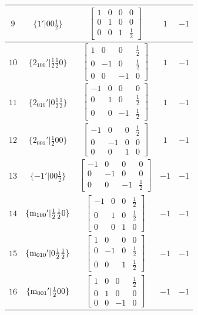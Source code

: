 \documentclass[fleqn,8pt]{jsarticle}
\begin{document}
\begin{longtable}{ccccc}
$ 9 $ & $ \{1{}'|0 0 \frac{1}{2}\} $ & $ \begin{bmatrix} 1 & 0 & 0 & 0 \\ 0 & 1 & 0 & 0 \\ 0 & 0 & 1 & \frac{1}{2} \end{bmatrix} $ & $ 1 $ & $ -1 $ \\ \hline
$ 10 $ & $ \{2{}_{100}{}'|\frac{1}{2} \frac{1}{2} 0\} $ & $ \begin{bmatrix} 1 & 0 & 0 & \frac{1}{2} \\ 0 & -1 & 0 & \frac{1}{2} \\ 0 & 0 & -1 & 0 \end{bmatrix} $ & $ 1 $ & $ -1 $ \\ \hline
$ 11 $ & $ \{2{}_{010}{}'|0 \frac{1}{2} \frac{1}{2}\} $ & $ \begin{bmatrix} -1 & 0 & 0 & 0 \\ 0 & 1 & 0 & \frac{1}{2} \\ 0 & 0 & -1 & \frac{1}{2} \end{bmatrix} $ & $ 1 $ & $ -1 $ \\ \hline
$ 12 $ & $ \{2{}_{001}{}'|\frac{1}{2} 0 0\} $ & $ \begin{bmatrix} -1 & 0 & 0 & \frac{1}{2} \\ 0 & -1 & 0 & 0 \\ 0 & 0 & 1 & 0 \end{bmatrix} $ & $ 1 $ & $ -1 $ \\ \hline
$ 13 $ & $ \{-1{}'|0 0 \frac{1}{2}\} $ & $ \begin{bmatrix} -1 & 0 & 0 & 0 \\ 0 & -1 & 0 & 0 \\ 0 & 0 & -1 & \frac{1}{2} \end{bmatrix} $ & $ -1 $ & $ -1 $ \\ \hline
$ 14 $ & $ \{{\rm m}_{100}{}'|\frac{1}{2} \frac{1}{2} 0\} $ & $ \begin{bmatrix} -1 & 0 & 0 & \frac{1}{2} \\ 0 & 1 & 0 & \frac{1}{2} \\ 0 & 0 & 1 & 0 \end{bmatrix} $ & $ -1 $ & $ -1 $ \\ \hline
$ 15 $ & $ \{{\rm m}_{010}{}'|0 \frac{1}{2} \frac{1}{2}\} $ & $ \begin{bmatrix} 1 & 0 & 0 & 0 \\ 0 & -1 & 0 & \frac{1}{2} \\ 0 & 0 & 1 & \frac{1}{2} \end{bmatrix} $ & $ -1 $ & $ -1 $ \\ \hline
$ 16 $ & $ \{{\rm m}_{001}{}'|\frac{1}{2} 0 0\} $ & $ \begin{bmatrix} 1 & 0 & 0 & \frac{1}{2} \\ 0 & 1 & 0 & 0 \\ 0 & 0 & -1 & 0 \end{bmatrix} $ & $ -1 $ & $ -1 $ \\
\end{longtable}
\end{document}
